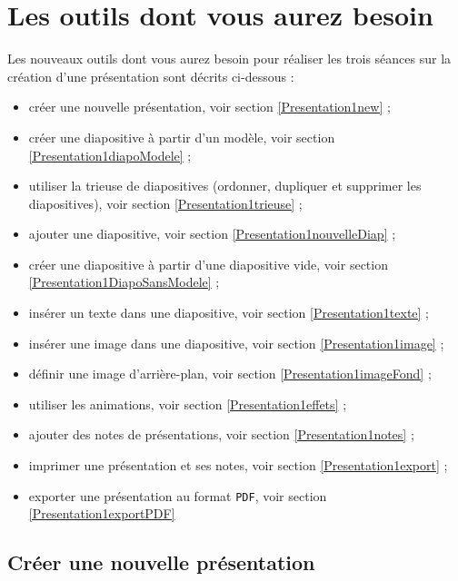 


\section{Les outils dont vous aurez besoin}\label{Presentation6eOutils}

Les nouveaux outils dont vous aurez besoin pour réaliser les trois séances sur la création d'une présentation sont décrits ci-dessous :


\begin{itemize}   
\item créer une nouvelle présentation, voir section \vref{Presentation1new} ;
\item créer une diapositive à partir d'un modèle, voir section \vref{Presentation1diapoModele} ;
\item utiliser la trieuse de diapositives (ordonner, dupliquer et supprimer les diapositives), voir section \vref{Presentation1trieuse} ;
\item ajouter une diapositive, voir section \vref{Presentation1nouvelleDiap} ;
\item créer une diapositive à partir d'une diapositive vide, voir section \vref{Presentation1DiapoSansModele} ;
\item insérer un texte dans une diapositive, voir section \vref{Presentation1texte} ;
\item insérer une image dans une diapositive, voir section \vref{Presentation1image} ;
\item définir une image d'arrière-plan, voir section \vref{Presentation1imageFond} ;
\item utiliser les animations, voir section \vref{Presentation1effets} ;

\item ajouter des notes de présentations, voir section \vref{Presentation1notes} ;
\item imprimer une présentation et ses notes, voir section \vref{Presentation1export} ;
\item exporter une présentation au format \texttt{PDF}, voir section \vref{Presentation1exportPDF} 
\end{itemize}  




\subsection{Créer une nouvelle présentation}\label{Presentation1new}

